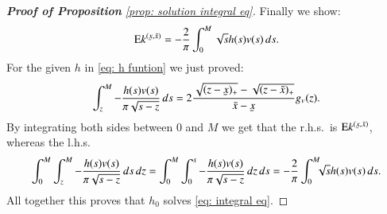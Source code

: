 \begin{proof}[\hypertarget{proof of solution integral eq}{\textbf{Proof of Proposition}}  \ref{prop: solution integral eq}]
    Finally we show:
    \begin{align*}
        \ex k^{(\ubar{x},\bar{x})} = -\frac{2}{\pi} \int_{0}^M \sqrt{s} h(s) v(s) \, ds.
    \end{align*}
    For the given $h$ in \eqref{eq: h funtion} we just proved:
    \begin{align}\label{eq: mapping of h}
        \int_{z}^{M}  -\frac{h(s)v(s)}{\pi \sqrt{s-z}} \, ds = 2 \frac{\sqrt{(z-\ubar{x})_{+}} - \sqrt{(z-\bar{x})_{+}}}{\bar{x}-\ubar{x}} g_{\scriptscriptstyle{V}}(z).
    \end{align}
    By integrating both sides between $0$ and $M$ we get that the r.h.s.\ is $ \ex k^{(\ubar{x},\bar{x})}$, whereas the l.h.s.\
    \begin{align*}
       \int_{0}^{M} \int_{z}^{M}  -\frac{h(s)v(s)}{\pi \sqrt{s-z}} \, ds \, dz = \int_{0}^{M} \int_{0}^{s}  -\frac{h(s)v(s)}{\pi \sqrt{s-z}} \, dz \, ds= -\frac{2}{\pi} \int_{0}^M \hspace{-0.2cm} \sqrt{s} h(s) v(s) \, ds.
    \end{align*}
    All together this proves that $h_0$ solves \eqref{eq: integral eq}.
\end{proof}

